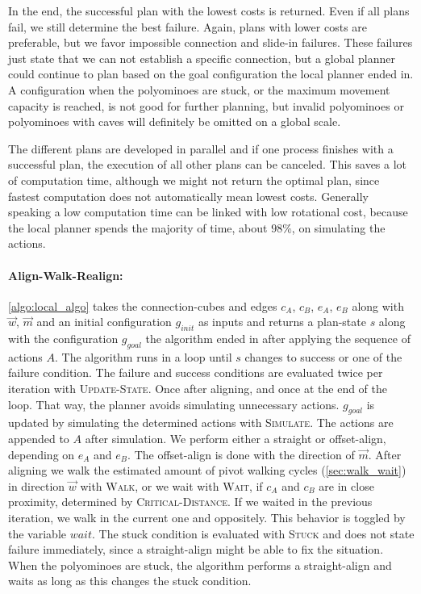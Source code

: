 In the end, the successful plan with the lowest costs is returned.
Even if all plans fail, we still determine the best failure.
Again, plans with lower costs are preferable, but we favor impossible connection and slide-in failures.
These failures just state that we can not establish a specific connection, but a global planner could continue to plan based on the goal configuration the local planner ended in.
A configuration when the polyominoes are stuck, or the maximum movement capacity is reached, is not good for further planning, but invalid polyominoes or polyominoes with caves will definitely be omitted on a global scale.

The different plans are developed in parallel and if one process finishes with a successful plan, the execution of all other plans can be canceled.
This saves a lot of computation time, although we might not return the optimal plan, since fastest computation does not automatically mean lowest costs.
Generally speaking a low computation time can be linked with low rotational cost, because the local planner spends the majority of time, about $98\%$, on simulating the actions.

\paragraph{Align-Walk-Realign:}

\autoref{algo:local_algo} takes the connection-cubes and edges $c_A$, $c_B$, $e_A$, $e_B$ along with $\vec{w}$, $\vec{m}$ and an initial configuration $g_{init}$ as inputs and returns a plan-state $s$ along with the configuration $g_{goal}$ the algorithm ended in after applying the sequence of actions $A$.
The algorithm runs in a loop until $s$ changes to success or one of the failure condition.
The failure and success conditions are evaluated twice per iteration with {\scshape Update-State}.
Once after aligning, and once at the end of the loop.
That way, the planner avoids simulating unnecessary actions.
$g_{goal}$ is updated by simulating the determined actions with {\scshape Simulate}.
The actions are appended to $A$ after simulation.
We perform either a straight or offset-align, depending on $e_A$ and $e_B$.
The offset-align is done with the direction of $\vec{m}$.
After aligning we walk the estimated amount of pivot walking cycles (\autoref{sec:walk_wait}) in direction $\vec{w}$ with {\scshape Walk}, or we wait with {\scshape Wait}, if $c_A$ and $c_B$ are in close proximity, determined by {\scshape Critical-Distance}.
If we waited in the previous iteration, we walk in the current one and oppositely.
This behavior is toggled by the variable $wait$. 
The stuck condition is evaluated with {\scshape Stuck} and does not state failure immediately, since a straight-align might be able to fix the situation.
When the polyominoes are stuck, the algorithm performs a straight-align and waits as long as this changes the stuck condition.







